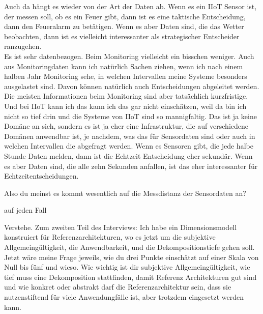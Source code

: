 \PA	Auch da hängt es wieder von der Art der Daten ab. Wenn es ein \ac{IIoT} Sensor ist, der messen soll, ob es ein Feuer gibt, dann ist es eine taktische Entscheidung, dann den Feueralarm zu betätigen. Wenn es aber Daten sind, die das Wetter beobachten, dann ist es vielleicht interessanter als strategischer Entscheider ranzugehen. \\
Es ist sehr datenbezogen. Beim Monitoring vielleicht ein bisschen weniger. Auch aus Monitoringdaten kann ich natürlich Sachen ziehen, wenn ich nach einem halben Jahr Monitoring sehe, in welchen Intervallen meine Systeme besonders ausgelastet sind. Davon können natürlich auch Entscheidungen abgeleitet werden. Die meisten Informationen beim Monitoring sind aber tatsächlich kurzfristige. Und bei \ac{IIoT} kann ich das kann ich das gar nicht einschätzen, weil da bin ich nicht so tief drin und die Systeme von \ac{IIoT} sind so mannigfaltig. Das ist ja keine Domäne an sich, sondern es ist ja eher eine Infrastruktur, die auf verschiedene Domänen anwendbar ist, je nachdem, was das für Sensordaten sind oder auch in welchen Intervallen die abgefragt werden. Wenn es Sensoren gibt, die jede halbe Stunde Daten melden, dann ist die Echtzeit Entscheidung eher sekundär. Wenn es aber Daten sind, die alle zehn Sekunden anfallen, ist das eher interessanter für Echtzeitentscheidungen.

\LF	 Also du meinst es kommt wesentlich auf die Messdistanz der Sensordaten an?

\PA	 auf jeden Fall

\LF	 Verstehe. Zum zweiten Teil des Interviews: Ich habe ein Dimensionsmodell konstruiert für Referenzarchitekturen, wo es jetzt um die subjektive Allgemeingültigkeit, die Anwendbarkeit, und die Dekompositionstiefe gehen soll. Jetzt wäre meine Frage jeweils, wie du drei Punkte einschätzt auf einer Skala von Null bis fünf und wieso. Wie wichtig ist dir subjektive Allgemeingültigkeit, wie tief muss eine Dekomposition stattfinden, damit Referenz Architekturen gut sind und wie konkret oder abstrakt darf die Referenzarchitektur sein, dass sie nutzenstiftend für viele Anwendungfälle ist, aber trotzdem eingesetzt werden kann.

